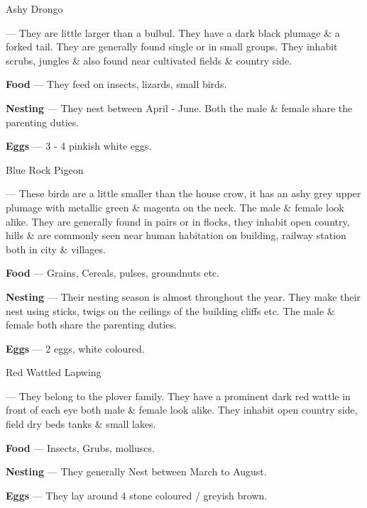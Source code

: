 \begin{bird}{Ashy Drongo}

 --- They are little larger than a bulbul. They have a dark black plumage \& a forked tail. They are generally found single or in small groups. They inhabit scrubs, jungles \& also found near cultivated fields \& country side.

{\large\bf Food} --- They feed on insects, lizards, small birds.

{\large\bf Nesting} --- They nest between April - June. Both the male \& female share the parenting duties.

{\large\bf Eggs} --- 3 - 4 pinkish white eggs.
\end{bird}

\newpage

\begin{bird}{Blue Rock Pigeon}

 --- These birds are a little smaller than the house crow, it has an ashy grey upper plumage with metallic green \& magenta on the neck. The male \& female look alike. They are generally found in pairs or in flocks, they inhabit open country, hills \& are commonly seen near human habitation on building, railway station both in city \& villages.

{\large\bf Food} --- Grains, Cereals, pulses, groundnuts etc.

{\large\bf Nesting} --- Their nesting season is almost throughout the year. They make their nest using sticks, twigs on the ceilings of the building cliffs etc. The male \& female both share the parenting duties.

{\large\bf Eggs} --- 2 eggs, white coloured.
\end{bird}

\begin{bird}{Red Wattled Lapwing}

 --- They belong to the plover family. They have a prominent dark red wattle in front of each eye both male \& female look alike. They inhabit open country side, field dry beds tanks \& small lakes.

{\large\bf Food} --- Insects, Grubs, molluscs.

{\large\bf Nesting} --- They generally Nest between March to August.

{\large\bf Eggs} --- They lay around 4 stone coloured / greyish brown.
\end{bird}

